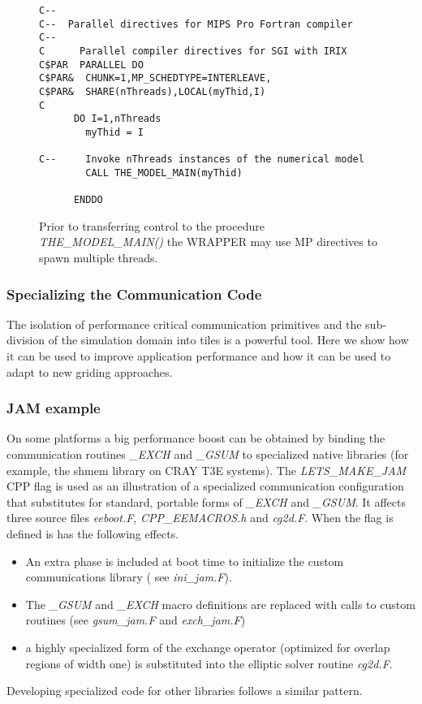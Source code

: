 \begin{figure}
\begin{verbatim}
C--
C--  Parallel directives for MIPS Pro Fortran compiler
C--
C      Parallel compiler directives for SGI with IRIX
C$PAR  PARALLEL DO
C$PAR&  CHUNK=1,MP_SCHEDTYPE=INTERLEAVE,
C$PAR&  SHARE(nThreads),LOCAL(myThid,I)
C
      DO I=1,nThreads
        myThid = I

C--     Invoke nThreads instances of the numerical model
        CALL THE_MODEL_MAIN(myThid)

      ENDDO
\end{verbatim}
  \caption{Prior to transferring control to the procedure {\em
      THE\_MODEL\_MAIN()} the WRAPPER may use MP directives to spawn
    multiple threads.  } \label{fig:mp_directives}
\end{figure}


\subsubsection{Specializing the Communication Code}

The isolation of performance critical communication primitives and the
sub-division of the simulation domain into tiles is a powerful tool.
Here we show how it can be used to improve application performance and
how it can be used to adapt to new griding approaches.

\subsubsection{JAM example}
\label{sect:jam_example}
On some platforms a big performance boost can be obtained by binding
the communication routines {\em \_EXCH} and {\em \_GSUM} to
specialized native libraries (for example, the shmem library on CRAY
T3E systems). The {\em LETS\_MAKE\_JAM} CPP flag is used as an
illustration of a specialized communication configuration that
substitutes for standard, portable forms of {\em \_EXCH} and {\em
  \_GSUM}. It affects three source files {\em eeboot.F}, {\em
  CPP\_EEMACROS.h} and {\em cg2d.F}. When the flag is defined is has
the following effects.
\begin{itemize}
\item An extra phase is included at boot time to initialize the custom
  communications library ( see {\em ini\_jam.F}).
\item The {\em \_GSUM} and {\em \_EXCH} macro definitions are replaced
  with calls to custom routines (see {\em gsum\_jam.F} and {\em
    exch\_jam.F})
\item a highly specialized form of the exchange operator (optimized
  for overlap regions of width one) is substituted into the elliptic
  solver routine {\em cg2d.F}.
\end{itemize}
Developing specialized code for other libraries follows a similar
pattern.

